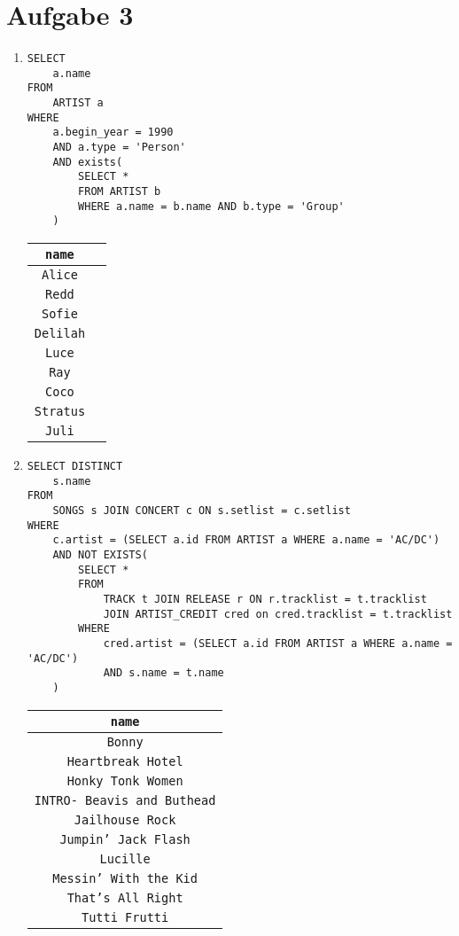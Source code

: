 \documentclass{article}
\begin{document}
\section*{Aufgabe 3}
    \begin{enumerate}
        \item
            \begin{verbatim}
SELECT
    a.name
FROM
    ARTIST a
WHERE
    a.begin_year = 1990
    AND a.type = 'Person'
    AND exists(
        SELECT *
        FROM ARTIST b
        WHERE a.name = b.name AND b.type = 'Group'
    )
            \end{verbatim}
            \begin{tabular}{|c|c|}
                \texttt{name} \\
                \toprule
                \texttt{Alice} \\
                \texttt{Redd} \\
                \texttt{Sofie} \\
                \texttt{Delilah} \\
                \texttt{Luce} \\
                \texttt{Ray} \\
                \texttt{Coco} \\
                \texttt{Stratus} \\
                \texttt{Juli} \\
            \end{tabular}
        \item
            \begin{verbatim}
SELECT DISTINCT
    s.name
FROM
    SONGS s JOIN CONCERT c ON s.setlist = c.setlist
WHERE
    c.artist = (SELECT a.id FROM ARTIST a WHERE a.name = 'AC/DC')
    AND NOT EXISTS(
        SELECT *
        FROM
            TRACK t JOIN RELEASE r ON r.tracklist = t.tracklist
            JOIN ARTIST_CREDIT cred on cred.tracklist = t.tracklist
        WHERE
            cred.artist = (SELECT a.id FROM ARTIST a WHERE a.name = 'AC/DC')
            AND s.name = t.name
    )
            \end{verbatim}
            \begin{tabular}{|c|}
                \texttt{name} \\
                \toprule
                \texttt{Bonny} \\
                \texttt{Heartbreak Hotel} \\
                \texttt{Honky Tonk Women} \\
                \texttt{INTRO- Beavis and Buthead} \\
                \texttt{Jailhouse Rock} \\
                \texttt{Jumpin' Jack Flash} \\
                \texttt{Lucille} \\
                \texttt{Messin' With the Kid} \\
                \texttt{That's All Right} \\
                \texttt{Tutti Frutti} \\
            \end{tabular}
    \end{enumerate}
\end{document}
